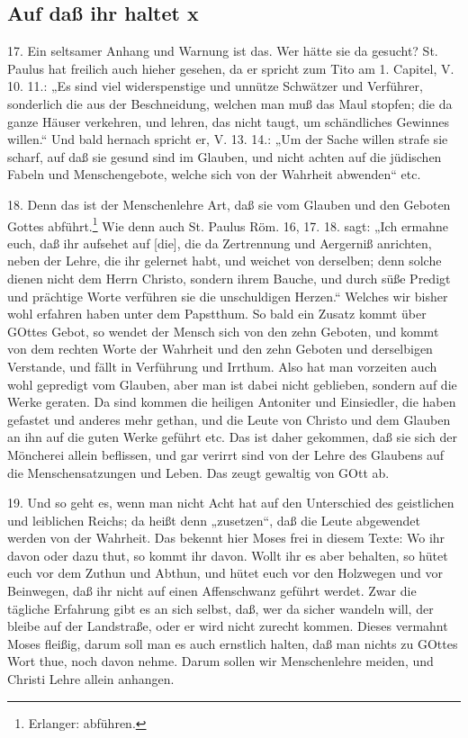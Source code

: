 \subsection{Auf daß ihr haltet x}

17. Ein seltsamer Anhang und Warnung ist das. Wer hätte sie da gesucht? St. Paulus hat freilich auch hieher gesehen, da er spricht zum Tito am 1. Capitel, V. 10. 11.: „Es sind viel widerspenstige und unnütze Schwätzer und Verführer, sonderlich die aus der Beschneidung, welchen man muß das Maul stopfen; die da ganze Häuser verkehren, und lehren, das nicht taugt, um schändliches Gewinnes willen.“ Und bald hernach spricht er, V. 13. 14.: „Um der Sache willen strafe sie scharf, auf daß sie gesund sind im Glauben, und nicht achten auf die jüdischen Fabeln und Menschengebote, welche sich von der Wahrheit abwenden“ etc.

18. Denn das ist der Menschenlehre Art, daß sie vom Glauben und den Geboten Gottes abführt.\footnote{Erlanger: abführen.} Wie denn auch St. Paulus Röm. 16, 17. 18. sagt: „Ich ermahne euch, daß ihr aufsehet auf [die], die da Zertrennung und Aergerniß anrichten, neben der Lehre, die ihr gelernet habt, und weichet von derselben; denn solche dienen nicht dem Herrn Christo, sondern ihrem Bauche, und durch süße Predigt und prächtige Worte verführen sie die unschuldigen Herzen.“ Welches wir bisher wohl erfahren haben unter dem Papstthum. So bald ein Zusatz kommt über GOttes Gebot, so wendet der Mensch sich von den zehn Geboten, und kommt von dem rechten Worte der Wahrheit und den zehn Geboten und derselbigen Verstande, und fällt in Verführung und Irrthum. Also hat man vorzeiten auch wohl gepredigt vom Glauben, aber man ist dabei nicht geblieben, sondern auf die Werke geraten. Da sind kommen die heiligen Antoniter und Einsiedler, die haben gefastet und anderes mehr gethan, und die Leute von Christo und dem Glauben an ihn auf die guten Werke
geführt etc. Das ist daher gekommen, daß sie sich der Möncherei allein beflissen, und gar verirrt sind von der Lehre des Glaubens auf die Menschensatzungen und Leben. Das zeugt gewaltig von GOtt ab.

19. Und so geht es, wenn man nicht Acht hat auf den Unterschied des geistlichen und leiblichen Reichs; da heißt denn „zusetzen“, daß die Leute abgewendet werden von der Wahrheit. Das bekennt hier Moses frei in diesem Texte: Wo ihr davon oder dazu thut, so kommt ihr davon. Wollt ihr es aber behalten, so hütet euch vor dem Zuthun und Abthun, und hütet euch vor den Holzwegen und vor Beinwegen, daß ihr nicht auf einen Affenschwanz geführt werdet. Zwar die tägliche Erfahrung gibt es an sich selbst, daß, wer da sicher wandeln will, der bleibe auf der Landstraße, oder er wird nicht zurecht kommen. Dieses vermahnt Moses fleißig, darum soll man es auch ernstlich halten, daß man nichts zu GOttes Wort thue, noch davon nehme. Darum sollen wir Menschenlehre meiden, und Christi Lehre allein anhangen.

